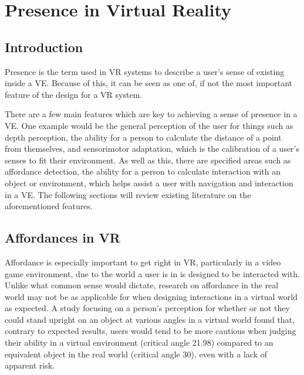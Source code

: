 \section{Presence in Virtual Reality}
\label{lr:vr}

	\subsection{Introduction}
	\label{lr:vr:intro}
		Presence is the term used in VR systems to describe a user's sense of existing inside a VE. Because of this, it can be seen as one of, if not the most important feature of the design for a VR system.

		There are a few main features which are key to achieving a sense of presence in a VE. One example would be the general perception of the user for things such as depth perception, the ability for a person to calculate the distance of a point from themselves, and sensorimotor adaptation, which is the calibration of a user's senses to fit their environment.
		As well as this, there are specified areas such as affordance detection, the ability for a person to calculate interaction with an object or environment, which helps assist a user with navigation and interaction in a VE.
		The following sections will review existing literature on the aforementioned features.

	\subsection{Affordances in VR}
	\label{lr:vr:affordances}
		Affordance is especially important to get right in VR, particularly in a video game environment, due to the world a user is in is designed to be interacted with.
		Unlike what common sense would dictate, research on affordance in the real world may not be as applicable for when designing interactions in a virtual world as expected.
		A study \cite{Regia-Corte2012} focusing on a person's perception for whether or not they could stand upright on an object at various angles in a virtual world found that, contrary to expected results, users would tend to be more cautious when judging their ability in a virtual environment (critical angle 21.98\degree) compared to an equivalent object in the real world (critical angle 30\degree), even with a lack of apparent risk.

